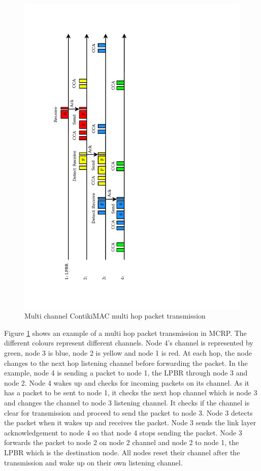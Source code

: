\begin{figure}
\centering
\includegraphics[trim=2cm 2cm 10cm 2cm, clip=true, totalheight=0.6\textheight, angle=270]{macExample2.pdf}
\caption{Multi channel ContikiMAC multi hop packet transmission}
\label{fig_mac}
\end{figure}

Figure \ref{fig_mac} shows an example of a multi hop packet transmission in MCRP. The different colours represent different channels. Node 4's channel is represented by green, node 3 is blue, node 2 is yellow and node 1 is red. At each hop, the node changes to the next hop listening channel before forwarding the packet. In the example, node 4 is sending a packet to node 1, the LPBR through node 3 and node 2. Node 4 wakes up and checks for incoming packets on its channel. As it has a packet to be sent to node 1, it checks the next hop channel which is node 3 and changes the channel to node 3 listening channel. It checks if the channel is clear for transmission and proceed to send the packet to node 3. Node 3 detects the packet when it wakes up and receives the packet. Node 3 sends the link layer acknowledgement to node 4 so that node 4 stops sending the packet. Node 3 forwards the packet to node 2 on node 2 channel and node 2 to node 1, the LPBR which is the destination node. All nodes reset their channel after the transmission and wake up on their own listening channel. 

